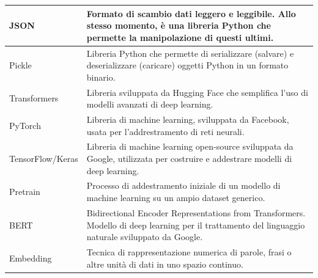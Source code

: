 \documentclass[12pt, letterpaper]{article}
\begin{document}
\begin{longtable}{|l|p{10cm}|}
	\hline
	JSON & Formato di scambio dati leggero e leggibile. Allo stesso momento, è una libreria Python che permette la manipolazione di questi ultimi. \\
	\hline
	Pickle & Libreria Python che permette di serializzare (salvare) e deserializzare (caricare) oggetti Python in un formato binario. \\
	\hline
	Transformers & Libreria sviluppata da Hugging Face che semplifica l'uso di modelli avanzati di deep learning. \\
	\hline
	PyTorch & Libreria di machine learning, sviluppata da Facebook, usata per l'addrestramento di reti neurali. \\
	\hline
	TensorFlow/Keras & Libreria di machine learning open-source sviluppata da Google, utilizzata per costruire e addestrare modelli di deep learning. \\
	\hline
	Pretrain & Processo di addestramento iniziale di un modello di machine learning su un ampio dataset generico. \\
	\hline
	BERT & Bidirectional Encoder Representations from Transformers. Modello di deep learning per il trattamento del linguaggio naturale sviluppato da Google. \\
	\hline
	Embedding & Tecnica di rappresentazione numerica di parole, frasi o altre unità di dati in uno spazio continuo. \\
	\hline
\end{longtable}
\end{document}
